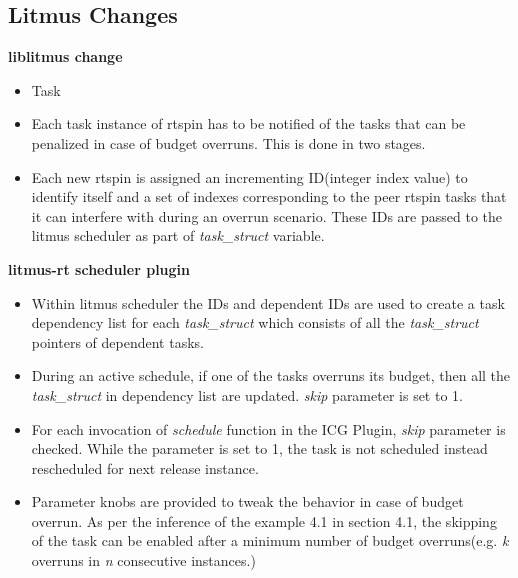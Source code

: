 \subsection{Litmus Changes}
\textbf{liblitmus change}
\begin{itemize}
	\item Task 
	\item Each task instance of rtspin has to be notified of the tasks that can be penalized in case of budget overruns. This is done in two stages.
	\item Each new rtspin is assigned an incrementing ID(integer index value) to identify itself and a set of indexes corresponding to the peer rtspin tasks that it can interfere with during an overrun scenario. These IDs are passed to the litmus scheduler as part of \textit{task\_struct} variable.
\end{itemize}
\textbf{litmus-rt scheduler plugin}
\begin{itemize}
	\item Within litmus scheduler the IDs and dependent IDs are used to create a task dependency list for each \textit{task\_struct} which consists of all the \textit{task\_struct} pointers of dependent tasks.
	\item During an active schedule, if one of the tasks overruns its budget, then all the \textit{task\_struct} in dependency list are updated. \textit{skip} parameter is set to 1.
	\item For each invocation of \textit{schedule} function in the ICG Plugin, \textit{skip} parameter is checked. While the parameter is set to 1, the task is not scheduled instead rescheduled for next release instance.
	\item Parameter knobs are provided to tweak the behavior in case of budget overrun. As per the inference of the example 4.1 in section 4.1, the skipping of the task can be enabled after a minimum number of budget overruns(e.g. \textit{k} overruns in \textit{n} consecutive instances.)
\end{itemize}